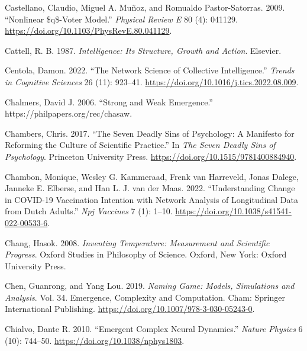 \documentclass[
  a4paper,
  DIV=11,
  numbers=noendperiod]{scrreprt}
\newlength{\cslhangindent}
\newlength{\cslentryspacingunit} %
\newenvironment{CSLReferences}[2] %
 {%
  \setlength{\parindent}{0pt}
  \ifodd #1
  \let\oldpar\par
  \def\par{\hangindent=\cslhangindent\oldpar}
  \fi
  \setlength{\parskip}{#2\cslentryspacingunit}
 }%
 {}
\begin{document}
\begin{CSLReferences}{1}{0}
\leavevmode{}%
Castellano, Claudio, Miguel A. Muñoz, and Romualdo Pastor-Satorras.
2009. {``Nonlinear \$q\$-Voter Model.''} \emph{Physical Review E} 80
(4): 041129. \url{https://doi.org/10.1103/PhysRevE.80.041129}.

\leavevmode{}%
Cattell, R. B. 1987. \emph{Intelligence: {Its Structure}, {Growth} and
{Action}}. {Elsevier}.

\leavevmode{}%
Centola, Damon. 2022. {``The Network Science of Collective
Intelligence.''} \emph{Trends in Cognitive Sciences} 26 (11): 923--41.
\url{https://doi.org/10.1016/j.tics.2022.08.009}.

\leavevmode{}%
Chalmers, David J. 2006. {``Strong and Weak Emergence.''}
https://philpapers.org/rec/chasaw.

\leavevmode{}%
Chambers, Chris. 2017. {``The {Seven Deadly Sins} of {Psychology}: {A
Manifesto} for {Reforming} the {Culture} of {Scientific Practice}.''} In
\emph{The {Seven Deadly Sins} of {Psychology}}. {Princeton University
Press}. \url{https://doi.org/10.1515/9781400884940}.

\leavevmode{}%
Chambon, Monique, Wesley G. Kammeraad, Frenk van Harreveld, Jonas
Dalege, Janneke E. Elberse, and Han L. J. van der Maas. 2022.
{``Understanding Change in {COVID-19} Vaccination Intention with Network
Analysis of Longitudinal Data from {Dutch} Adults.''} \emph{Npj
Vaccines} 7 (1): 1--10.
\url{https://doi.org/10.1038/s41541-022-00533-6}.

\leavevmode{}%
Chang, Hasok. 2008. \emph{Inventing {Temperature}: {Measurement} and
{Scientific Progress}}. Oxford {Studies} in {Philosophy} of {Science}.
{Oxford, New York}: {Oxford University Press}.

\leavevmode{}%
Chen, Guanrong, and Yang Lou. 2019. \emph{Naming {Game}: {Models},
{Simulations} and {Analysis}}. Vol. 34. Emergence, {Complexity} and
{Computation}. {Cham}: {Springer International Publishing}.
\url{https://doi.org/10.1007/978-3-030-05243-0}.

\leavevmode{}%
Chialvo, Dante R. 2010. {``Emergent Complex Neural Dynamics.''}
\emph{Nature Physics} 6 (10): 744--50.
\url{https://doi.org/10.1038/nphys1803}.


\end{CSLReferences}
\end{document}
